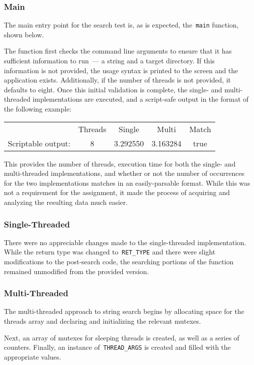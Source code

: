\documentclass{article}
\newcommand{\clst}[2]{
	\begin{center}
	\parbox{.6\textwidth}{
	}
	\end{center}
}
\newcommand{\ttt}[1]{\texttt{#1}}
\begin{document}
\subsubsection{Main}
The main entry point for the search test is, as is expected, the~\ttt{main}
function, shown below.
%
\clst{24}{46}
%
The function first checks the command line arguments to ensure that it has
sufficient information to run~--- a string and a target directory.  If this
information is not provided, the usage syntax is printed to the screen and the
application exists.  Additionally, if the number of threads is not provided, it
defaults to eight.  Once this initial validation is complete, the single- and
multi-threaded implementations are executed, and a script-safe output in the
format of the following example:
%
\begin{table}[H]
	\centering
	\begin{tabular}{ccccc}
		                    & Threads & Single & Multi & Match \\
		Scriptable output:  & 8   & 3.292550   & 3.163284 & true \\
	\end{tabular}
\end{table}
%
This provides the number of threads, execution time for both the single- and
multi-threaded implementations, and whether or not the number of occurrences
for the two implementations matches in an easily-parsable format.  While this
was not a requirement for the assignment, it made the process of acquiring and
analyzing the resulting data much easier.

\subsubsection{Single-Threaded}
There were no appreciable changes made to the single-threaded implementation.
While the return type was changed to~\ttt{RET\_TYPE} and there were slight
modifications to the post-search code, the searching portions of the function
remained unmodified from the provided version.

\subsubsection{Multi-Threaded}
The multi-threaded approach to string search begins by allocating space for the
threads array and declaring and initializing the relevant mutexes.
%
\clst{194}{226}
%
Next, an array of mutexes for sleeping threads is created, as well as a series
of counters.  Finally, an instance of~\ttt{THREAD\_ARGS} is created and filled
with the appropriate values.
\end{document}
